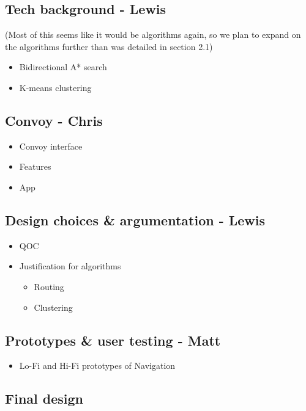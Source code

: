 \documentclass{article}
\begin{document}
\subsection{Tech background - Lewis}\label{ssec:nav-tech}
(Most of this seems like it would be algorithms again, so we plan to expand on the algorithms further than was detailed in section 2.1)
\begin{itemize}
  \item Bidirectional A* search
  \item K-means clustering
\end{itemize}

\subsection{Convoy - Chris}\label{ssec:nav-convoy}
\begin{itemize}
  \item Convoy interface
  \item Features
  \item App
\end{itemize}

\subsection{Design choices \& argumentation - Lewis}\label{ssec:nav-design}
\begin{itemize}
  \item QOC
  \item Justification for algorithms
    \begin{itemize}
      \item Routing
      \item Clustering
    \end{itemize}
\end{itemize}

\subsection{Prototypes \& user testing - Matt}\label{ssec:nav-prototypes-testing}
\begin{itemize}
  \item Lo-Fi and Hi-Fi prototypes of Navigation
\end{itemize}

\subsection{Final design}\label{ssec:nav-final-design}
\end{document}
